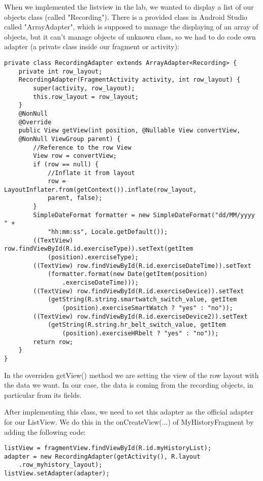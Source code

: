 \documentclass[11pt]{article}
\begin{document}
When we implemented the listview in the lab, we wanted to display a list of our objects class (called "Recording"). There is a provided class in Android Studio called "ArrayAdapter", which is supposed to manage the displaying of an array of objects, but it can't manage objects of unknown class, so we had to do code own adapter (a private class inside our fragment or activity):
\begin{lstlisting}
private class RecordingAdapter extends ArrayAdapter<Recording> {
    private int row_layout;
    RecordingAdapter(FragmentActivity activity, int row_layout) {
        super(activity, row_layout);
        this.row_layout = row_layout;
    }
    @NonNull
    @Override
    public View getView(int position, @Nullable View convertView,
    @NonNull ViewGroup parent) {
        //Reference to the row View
        View row = convertView;
        if (row == null) {
            //Inflate it from layout
            row = LayoutInflater.from(getContext()).inflate(row_layout,
            parent, false);
        }
        SimpleDateFormat formatter = new SimpleDateFormat("dd/MM/yyyy " +
            "hh:mm:ss", Locale.getDefault());
        ((TextView) row.findViewById(R.id.exerciseType)).setText(getItem
            (position).exerciseType);
        ((TextView) row.findViewById(R.id.exerciseDateTime)).setText
            (formatter.format(new Date(getItem(position)
                .exerciseDateTime)));
        ((TextView) row.findViewById(R.id.exerciseDevice)).setText
            (getString(R.string.smartwatch_switch_value, getItem
                (position).exerciseSmartWatch ? "yes" : "no"));
        ((TextView) row.findViewById(R.id.exerciseDevice2)).setText
            (getString(R.string.hr_belt_switch_value, getItem
                (position).exerciseHRbelt ? "yes" : "no"));
        return row;
    }
}
\end{lstlisting}
In the overriden getView() method we are setting the view of the row layout with the data we want. In our case, the data is coming from the recording objects, in particular from its fields.

After implementing this class, we need to set this adapter as the official adapter for our ListView. We do this in the
onCreateView(...) of MyHistoryFragment by adding the following code:
\begin{lstlisting}
listView = fragmentView.findViewById(R.id.myHistoryList);
adapter = new RecordingAdapter(getActivity(), R.layout
    .row_myhistory_layout);
listView.setAdapter(adapter);
\end{lstlisting}
\end{document}
